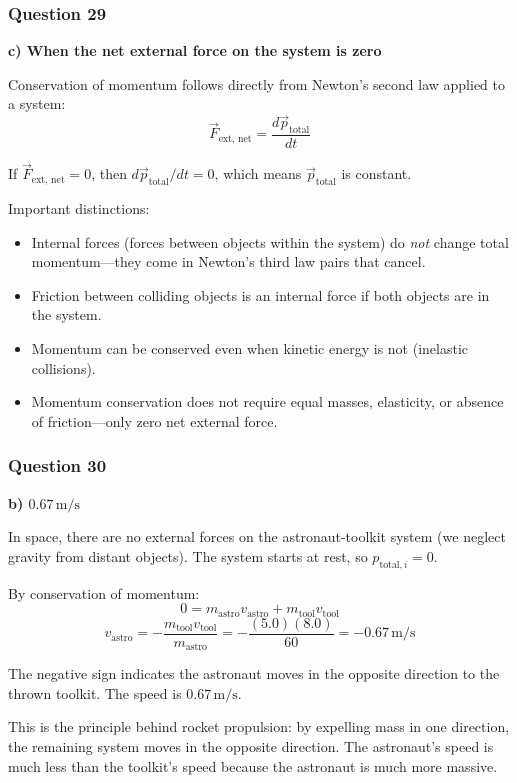 \documentclass[12pt,letterpaper]{article}
\begin{document}
\subsubsection*{Question 29}

\begin{answerbox}
\textbf{c) When the net external force on the system is zero}
\end{answerbox}

\begin{explanationbox}
Conservation of momentum follows directly from Newton's second law applied to a system:
\[
\vec{F}_{\text{ext, net}} = \frac{d\vec{p}_{\text{total}}}{dt}
\]

If $\vec{F}_{\text{ext, net}} = 0$, then $d\vec{p}_{\text{total}}/dt = 0$, which means $\vec{p}_{\text{total}}$ is constant.

Important distinctions:
\begin{itemize}
\item Internal forces (forces between objects within the system) do \emph{not} change total momentum---they come in Newton's third law pairs that cancel.
\item Friction between colliding objects is an internal force if both objects are in the system.
\item Momentum can be conserved even when kinetic energy is not (inelastic collisions).
\item Momentum conservation does not require equal masses, elasticity, or absence of friction---only zero net external force.
\end{itemize}
\end{explanationbox}

\subsubsection*{Question 30}

\begin{answerbox}
\textbf{b) $0.67\,\text{m/s}$}
\end{answerbox}

\begin{explanationbox}
In space, there are no external forces on the astronaut-toolkit system (we neglect gravity from distant objects). The system starts at rest, so $p_{\text{total},i} = 0$.

By conservation of momentum:
\[
0 = m_{\text{astro}} v_{\text{astro}} + m_{\text{tool}} v_{\text{tool}}
\]
\[
v_{\text{astro}} = -\frac{m_{\text{tool}} v_{\text{tool}}}{m_{\text{astro}}} = -\frac{(5.0)(8.0)}{60} = -0.67\,\text{m/s}
\]

The negative sign indicates the astronaut moves in the opposite direction to the thrown toolkit. The speed is $0.67\,\text{m/s}$.

This is the principle behind rocket propulsion: by expelling mass in one direction, the remaining system moves in the opposite direction. The astronaut's speed is much less than the toolkit's speed because the astronaut is much more massive.
\end{explanationbox}
\end{document}
